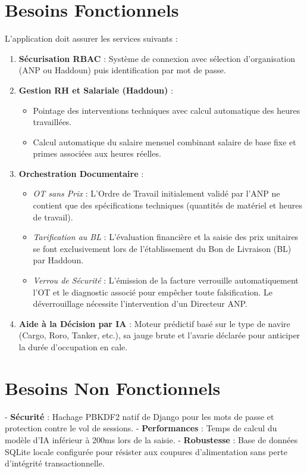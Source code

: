 \documentclass[12pt,a4paper,oneside]{report}
\begin{document}
\section{Besoins Fonctionnels}
L'application doit assurer les services suivants :
\begin{enumerate}
    \item \textbf{Sécurisation RBAC} : Système de connexion avec sélection d'organisation (ANP ou Haddoun) puis identification par mot de passe.
    \item \textbf{Gestion RH et Salariale (Haddoun)} :
    \begin{itemize}
        \item Pointage des interventions techniques avec calcul automatique des heures travaillées.
        \item Calcul automatique du salaire mensuel combinant salaire de base fixe et primes associées aux heures réelles.
    \end{itemize}
    \item \textbf{Orchestration Documentaire} :
    \begin{itemize}
        \item \emph{OT sans Prix} : L'Ordre de Travail initialement validé par l'ANP ne contient que des spécifications techniques (quantités de matériel et heures de travail).
        \item \emph{Tarification au BL} : L'évaluation financière et la saisie des prix unitaires se font exclusivement lors de l'établissement du Bon de Livraison (BL) par Haddoun.
        \item \emph{Verrou de Sécurité} : L'émission de la facture verrouille automatiquement l'OT et le diagnostic associé pour empêcher toute falsification. Le déverrouillage nécessite l'intervention d'un Directeur ANP.
    \end{itemize}
    \item \textbf{Aide à la Décision par IA} : Moteur prédictif basé sur le type de navire (Cargo, Roro, Tanker, etc.), sa jauge brute et l'avarie déclarée pour anticiper la durée d'occupation en cale.
\end{enumerate}

\section{Besoins Non Fonctionnels}
- \textbf{Sécurité} : Hachage PBKDF2 natif de Django pour les mots de passe et protection contre le vol de sessions.
- \textbf{Performances} : Temps de calcul du modèle d'IA inférieur à 200ms lors de la saisie.
- \textbf{Robustesse} : Base de données SQLite locale configurée pour résister aux coupures d'alimentation sans perte d'intégrité transactionnelle.
\end{document}
